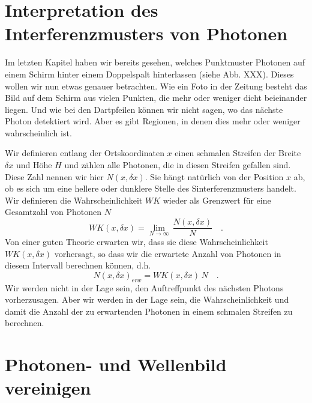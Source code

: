 \section{Interpretation des Interferenzmusters von Photonen }

Im letzten Kapitel haben wir bereits gesehen, welches Punktmuster Photonen auf einem Schirm hinter einem Doppelspalt hinterlassen (siehe Abb. XXX). Dieses wollen wir nun etwas genauer betrachten. Wie ein Foto in der Zeitung besteht das Bild auf dem Schirm aus vielen Punkten, die mehr oder weniger dicht beieinander liegen. Und wie bei den Dartpfeilen können wir nicht sagen, wo das nächste Photon detektiert wird. Aber es gibt Regionen, in denen dies mehr oder weniger wahrscheinlich ist.

Wir definieren entlang der Ortskoordinaten $x$ einen schmalen Streifen der Breite $\delta x$ und Höhe $H$ und zählen alle Photonen, die in diesen Streifen gefallen sind. Diese Zahl nennen wir hier $N(x, \delta x)$. Sie hängt natürlich von der Position $x$ ab, ob es sich um eine hellere oder dunklere Stelle des Sinterferenzmusters handelt. Wir definieren die Wahrscheinlichkeit $WK$ wieder als Grenzwert für eine Gesamtzahl von Photonen $N$
\begin{equation}
    WK(x, \delta x) = \lim_{N \rightarrow \infty} \, \frac{N(x, \delta x)}{N} \quad .
\end{equation}
Von einer guten Theorie erwarten wir, dass sie diese Wahrscheinlichkeit $WK(x, \delta x)$ vorhersagt, so dass wir die erwartete Anzahl von Photonen in diesem Intervall berechnen können, d.h. 
\begin{equation}
    N(x, \delta x)_{ erw} = WK(x, \delta x) \, N \quad .
\end{equation}
Wir werden nicht in der Lage sein, den Auftreffpunkt des nächsten Photons vorherzusagen. Aber wir werden in der Lage sein, die Wahrscheinlichkeit und damit die Anzahl der zu erwartenden Photonen in einem schmalen Streifen zu berechnen.


\section{Photonen- und Wellenbild vereinigen}

